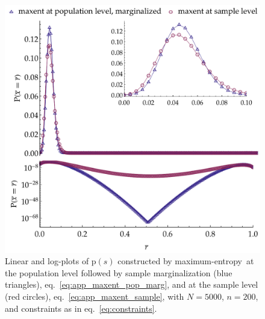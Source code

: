\documentclass[\ifafour a4paper,12pt,\else a5paper,10pt,\fi%
onecolumn,oneside,article,%
british%
]{memoir}
\theoremstyle{remark}
\theoremstyle{innote}
\newcommand*{\pf}{\mathrm{p}}%
\renewcommand*{\|}{\nonscript\,\vert\nonscript\;\mathopen{}}
\newcommand*{\eqn}{eq.}%
\newcommand*{\yrv}{s}
\newcommand*{\yNv}{N}
\newcommand*{\yrs}{\yrv}%
\newcommand*{\me}{maximum-entropy}
\begin{document}
\iffalse
\begin{figure}[!t]
\centering
\includegraphics[width=\linewidth]{different_maxent_pop_sample_200_realdata_2mom.pdf}%
\caption{Linear and log-plots of $\pf(\yrs)$ constructed by \me\ at
  the population level followed by sample marginalization (blue triangles),
  \eqn~\eqref{eq:app_maxent_pop_marg}, and at the sample level (red
  circles), \eqn~\eqref{eq:app_maxent_sample}, with $\yNv=5000$,
  $n=200$, and constraints as in \eqn~\eqref{eq:constraints}.}
\label{fig:diff_maxent_pop_sample}
\end{figure}%
%
\end{document}

